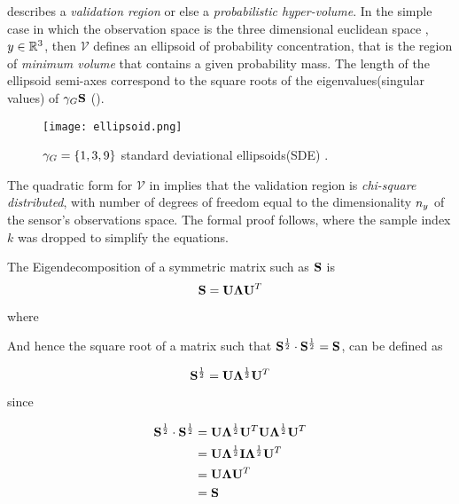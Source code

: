 describes a \emph{validation region} or else a \emph{probabilistic hyper-volume}. In the simple case in which the observation space is the three dimensional euclidean space , \ie ${y} \in {\mathbb{R}}^3$, then $\mathcal{V}$ defines an ellipsoid of probability concentration, that is the region of \emph{minimum volume }that contains a given probability mass. The length of the ellipsoid semi-axes correspond to the square roots of the eigenvalues(singular values) of ${\gamma_G} \mathbf{S}$ ().

\begin{figure}[H]
	\centering
	\texttt{[image: ellipsoid.png]}
	\caption{${\gamma_G} = \{1,3,9\}$ standard deviational ellipsoids(SDE) \cite{Wang2015}.}
	\label{fig:ellipsoid}
\end{figure}


The quadratic form for $\mathcal{V}$ in  implies that the validation region is \emph{chi-square distributed}, with number of degrees of freedom equal to the dimensionality $n_{y}$ of the sensor's observations space. The formal proof follows, where the sample index $k$ was dropped to simplify the equations.


The Eigendecomposition of a symmetric matrix such as $\mathbf{S}$ is
\begin{equation} \label{eq:matrixsquareroot}
\mathbf{S} = \mathbf{U} \mathbf{\Lambda} \mathbf{U}^T
\end{equation}

where 

And hence the square root of a matrix such that $\mathbf{S}^{\frac{1}{2}}\cdot \mathbf{S}^{\frac{1}{2}} = \mathbf{S}$, can be defined as

\begin{equation}\label{eq:matrixsquareroot2}
	\mathbf{S}^{\frac{1}{2}} =  \mathbf{U} \mathbf{\Lambda}^{\frac{1}{2}} \mathbf{U}^T
\end{equation}

since

\begin{align}
\mathbf{S}^{\frac{1}{2}} \cdot \mathbf{S}^{\frac{1}{2}} &= \mathbf{U} \mathbf{\Lambda}^{\frac{1}{2}}\mathbf{U}^T \mathbf{U} \mathbf{\Lambda}^{\frac{1}{2}}\mathbf{U}^T \\
&= \mathbf{U} \mathbf{\Lambda}^{\frac{1}{2}}\mathbf{I}\mathbf{\Lambda}^{\frac{1}{2}}\mathbf{U}^T \\
&= \mathbf{U}\mathbf{\Lambda}\mathbf{U}^T \\
&= \mathbf{S}
\end{align}

